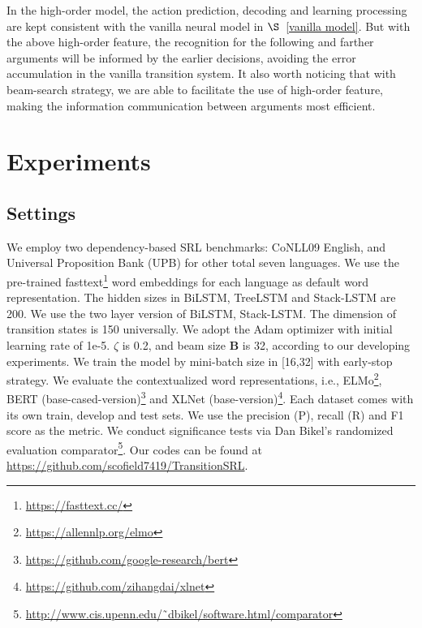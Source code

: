 \documentclass[letterpaper]{article} \usepackage{aaai21}  \usepackage{times}  \usepackage{helvet} \usepackage{courier}  \usepackage[hyphens]{url}  \usepackage{graphicx} \urlstyle{rm} \def\UrlFont{\rm}  \usepackage{natbib}  \usepackage{caption}
\begin{document}
\begin{CJK}{UTF8}{gbsn}
In the high-order model, the action prediction, decoding and learning processing are kept consistent with the vanilla neural model in $\S$~\ref{vanilla model}.
But with the above high-order feature,
the recognition for the following and farther arguments will be informed by the earlier decisions, avoiding the error accumulation in the vanilla transition system.
It also worth noticing that with beam-search strategy, we are able to facilitate the use of high-order feature, making the information communication between arguments most efficient.



































\section{Experiments}



\subsection{Settings}

We employ two dependency-based SRL benchmarks: CoNLL09 English, and Universal Proposition Bank (UPB) for other total seven languages.
We use the pre-trained fasttext\footnote{\url{https://fasttext.cc/}} word embeddings for each language as default word representation.
The hidden sizes in BiLSTM, TreeLSTM and Stack-LSTM are 200.
We use the two layer version of BiLSTM, Stack-LSTM.
The dimension of transition states is 150 universally.
We adopt the Adam optimizer with initial learning rate of 1e-5.
$\zeta$ is 0.2, and beam size \textbf{B} is 32, according to our developing experiments.
We train the model by mini-batch size in [16,32] with early-stop strategy.
We evaluate the contextualized word representations, i.e., ELMo\footnote{\url{https://allennlp.org/elmo}}, BERT (base-cased-version)\footnote{\url{https://github.com/google-research/bert}} and XLNet (base-version)\footnote{\url{https://github.com/zihangdai/xlnet}}.
Each dataset comes with its own train, develop and test sets.
We use the precision (P), recall (R) and F1 score as the metric.
We conduct significance tests via Dan Bikel’s randomized evaluation comparator\footnote{\url{http://www.cis.upenn.edu/˜dbikel/software.html/comparator}}.
Our codes can be found at \url{https://github.com/scofield7419/TransitionSRL}.







\end{CJK}
\end{document}
